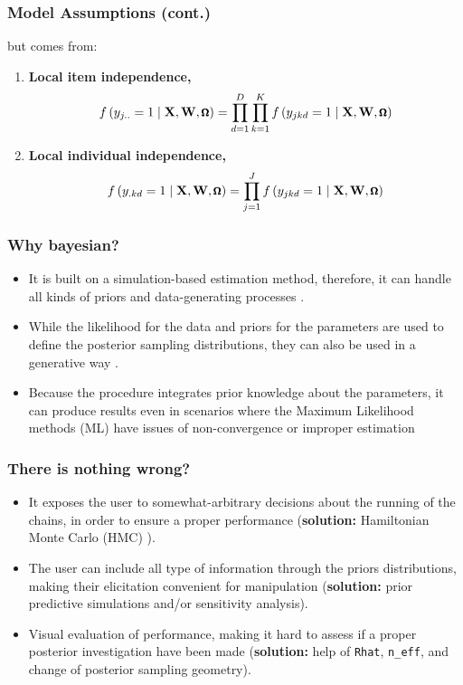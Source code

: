 \documentclass[arial,12pt,xcolor=dvipsnames]{beamer}
\begin{document}
%
\begin{frame}
	\frametitle{Model Assumptions (cont.)}
	but comes from:
	\begin{enumerate}
		\item \textbf{Local item independence,}
		\begin{equation}
			\footnotesize
			f \left( y_{j..}=1 \; | \; \mathbf{X}, \mathbf{W}, \pmb{\Omega} \right) = \prod_{d=1}^{D} \prod_{k=1}^{K} f \left( y_{jkd}=1 \; | \; \mathbf{X}, \mathbf{W}, \pmb{\Omega} \right)
		\end{equation}
		\item \textbf{Local individual independence,}
		\begin{equation}
			\footnotesize
			f \left( y_{.kd}=1 \; | \; \mathbf{X}, \mathbf{W}, \pmb{\Omega} \right) = \prod_{j=1}^{J} f \left( y_{jkd}=1 \; | \; \mathbf{X}, \mathbf{W}, \pmb{\Omega} \right)
		\end{equation}
	\end{enumerate}
\end{frame}
%
\begin{frame}
	\frametitle{Why bayesian?}
	\begin{itemize}
		\item It is built on a simulation-based estimation method, therefore, it can handle all kinds of priors and data-generating processes \cite{Fox_2010}.
		\item While the likelihood for the data and priors for the parameters are used to define the posterior sampling distributions, they can also be used in a generative way \cite{McElreath_2020}. 
		\item Because the procedure integrates prior knowledge about the parameters, it can produce results even in scenarios where the Maximum Likelihood methods (ML) have issues of non-convergence or improper estimation \cite{Skrondal_et_al_2004a, Fox_2010, McElreath_2020}
	\end{itemize}
\end{frame}
%
\begin{frame}
	\frametitle{There is nothing wrong?}
	\begin{itemize}
		\item It exposes the user to somewhat-arbitrary decisions about the running of the chains, in order to ensure a proper performance (\textbf{solution:} Hamiltonian Monte Carlo (HMC) \cite{Betancourt_et_al_2013} ).
		\item The user can include all type of information through the priors distributions, making their elicitation convenient for manipulation (\textbf{solution:} prior predictive simulations and/or sensitivity analysis).
		\item Visual evaluation of performance, making it hard to assess if a proper posterior investigation have been made \cite{Gelman_et_al_1996a}
		(\textbf{solution:} help of \texttt{Rhat}, \texttt{n\_eff}, and change of posterior sampling geometry).
	\end{itemize}
\end{frame}
\end{document}
